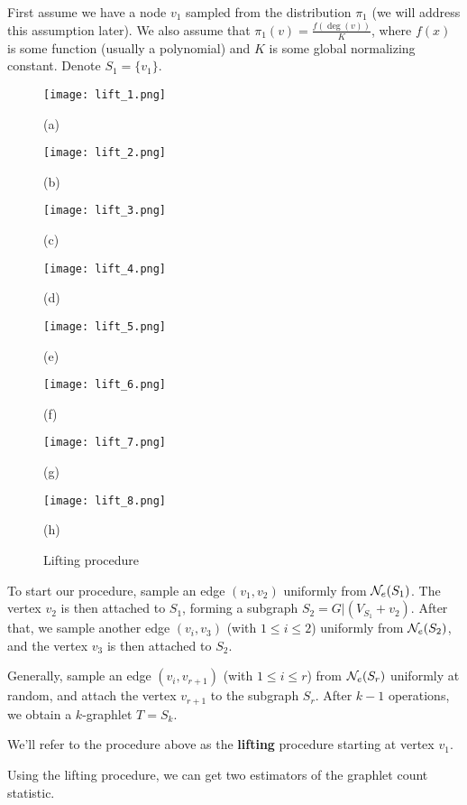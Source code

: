 	First assume we have a node $v_1$ sampled from the distribution $\pi_1$ (we will address this assumption later). 
	We also assume that $\pi_1(v) = \frac{f(\deg(v))}{K}$, where $f(x)$ is some function (usually a polynomial) and $K$ is some global normalizing constant.
	Denote $S_1 = \{v_1\}$.

\begin{figure}[t]
\begin{center}
\hspace*{\fill}
  \texttt{[image: lift\_1.png]}
  \caption*{(a)}
\endminipage\hfill
{}
  \texttt{[image: lift\_2.png]}
  \caption*{(b)}
\endminipage\hfill
{}
  \texttt{[image: lift\_3.png]}
  \caption*{(c)}\label{}
\endminipage\hfill
{}%
  \texttt{[image: lift\_4.png]}
  \caption*{(d)}
\endminipage
\hspace*{\fill}
\vskip 5pt
\hspace*{\fill}
  \texttt{[image: lift\_5.png]}
  \caption*{(e)}
\endminipage\hfill
{}
  \texttt{[image: lift\_6.png]}
  \caption*{(f)}
\endminipage\hfill
{}
  \texttt{[image: lift\_7.png]}
  \caption*{(g)}\label{}
\endminipage\hfill
{}%
  \texttt{[image: lift\_8.png]}
  \caption*{(h)}
\endminipage\hspace*{\fill}
\caption{Lifting procedure}
\end{center}
\end{figure}

	To start our procedure, sample an edge $(v_1,v_2)$ uniformly from $\mathcal{N}_e(S_1)$. 
	The vertex $v_2$ is then attached to $S_1$, forming a subgraph $S_2 = G|(V_{S_1} + {v_2})$.
	After that, we sample another edge $(v_i, v_3)$ (with $1\leq i\leq 2$) uniformly from $\mathcal{N}_e(S_2)$, and the vertex $v_3$ is then attached to $S_2$.
	
	Generally, sample an edge $(v_i, v_{r+1})$ (with $1\leq i \leq r$) from $\mathcal{N}_e(S_r)$ uniformly at random, and attach the vertex $v_{r+1}$ to the subgraph $S_r$.
	After $k-1$ operations, we obtain a $k$-graphlet $T = S_k$.
	
	We'll refer to the procedure above as the \textbf{lifting} procedure starting at vertex $v_1$.
	
	Using the lifting procedure, we can get two estimators of the graphlet count statistic.
	
